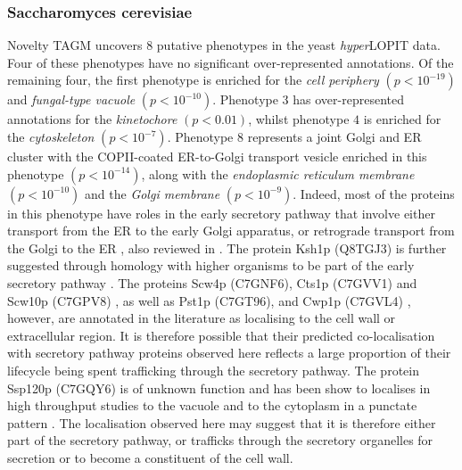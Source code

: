 \documentclass[12pt,english]{article}
\begin{document}
 \subsubsection{Saccharomyces cerevisiae}
Novelty TAGM uncovers $8$ putative phenotypes in the yeast \textit{hyper}LOPIT data. Four of these phenotypes have no significant over-represented annotations. Of the remaining four, the first phenotype is enriched for the \textit{cell periphery} $(p < 10^{-19})$ and \textit{fungal-type vacuole} $(p < 10^{-10})$. Phenotype $3$ has over-represented annotations for the \textit{kinetochore} $(p < 0.01)$, whilst phenotype $4$ is enriched for the \textit{cytoskeleton} $(p < 10^{-7})$. Phenotype $8$ represents a joint Golgi and ER cluster with the COPII-coated ER-to-Golgi transport vesicle enriched in this phenotype $(p < 10^{-14})$, along with the \textit{endoplasmic reticulum membrane} $(p < 10^{-10})$ and the \textit{Golgi membrane} $(p < 10^{-9})$. Indeed, most of the proteins in this phenotype have roles in the early secretory pathway that involve either transport from the ER to the early Golgi apparatus, or retrograde transport from the Golgi to the ER \citep{Bue:2006,Inadome:2005, Otte:2001, Yofe:2016}, also reviewed in \citep{Delic:2013}. The protein Ksh1p (Q8TGJ3) is further suggested through homology with higher organisms to be part of the early secretory pathway \citep{Wendler:2010}. The proteins Scw4p (C7GNF6), Cts1p (C7GVV1) and Scw10p (C7GPV8) \citep{Cappellaro:1998}, as well as Pst1p (C7GT96)\citep{Pardo:2004}, and Cwp1p (C7GVL4) \citep{Yin:2005}, however, are annotated in the literature as localising to the cell wall or extracellular region. It is therefore possible that their predicted co-localisation with secretory pathway proteins observed here reflects a large proportion of their lifecycle being spent trafficking through the secretory pathway. The protein Ssp120p (C7GQY6) is of unknown function and has been show to localises in high throughput studies to the vacuole \citep{Yofe:2016} and to the cytoplasm in a punctate pattern \citep{Huh:2003}. The localisation observed here may suggest that it is therefore either part of the secretory pathway, or trafficks through the secretory organelles for secretion or to become a constituent of the cell wall. 
 
\end{document}
